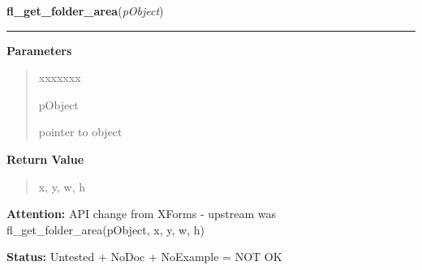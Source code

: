\hspace{.8\funcindent}\begin{boxedminipage}{\funcwidth}

    \raggedright \textbf{fl\_get\_folder\_area}(\textit{pObject})

    \vspace{-1.5ex}

    \rule{\textwidth}{0.5\fboxrule}
\setlength{\parskip}{2ex}
\setlength{\parskip}{1ex}
      \textbf{Parameters}
      \vspace{-1ex}

      \begin{quote}
        \begin{Ventry}{xxxxxxx}

          \item[pObject]

          pointer to object

        \end{Ventry}

      \end{quote}

      \textbf{Return Value}
    \vspace{-1ex}

      \begin{quote}
      x, y, w, h

      \end{quote}

\textbf{Attention:} API change from XForms - upstream was fl\_get\_folder\_area(pObject, x, y, 
w, h)



\textbf{Status:} Untested + NoDoc + NoExample = NOT OK



    \end{boxedminipage}

    \label{xformslib:library:fl_replace_folder_bynumber}

    \vspace{0.5ex}

